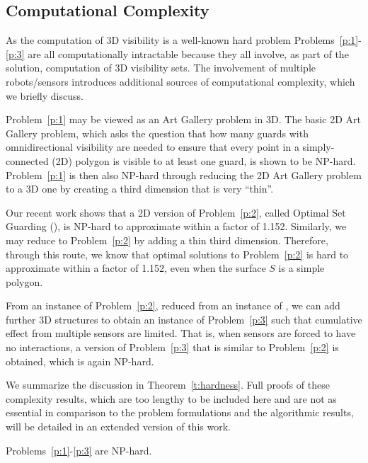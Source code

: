 \subsection{Computational Complexity}\label{subsec:complexity}
\vspace{-1mm}
As the computation of 3D visibility is a well-known hard problem \cite{canny1987new}
Problems~\ref{p:1}-\ref{p:3} are all computationally intractable because they all involve, as part of the solution, computation of 3D visibility sets. The involvement of multiple robots/sensors introduces additional sources of computational complexity, which we briefly discuss. 

Problem~\ref{p:1} may be viewed as an Art Gallery \cite{o1987art} problem in 3D. The basic 2D Art Gallery problem, which asks the question that how many guards with omnidirectional visibility are needed to ensure that every point in a simply-connected (2D) polygon is visible to at least one guard, is shown to be NP-hard\cite{lee1986computational}. Problem~\ref{p:1} is then also NP-hard through reducing the 2D Art Gallery problem to a 3D one by creating a third dimension that is very ``thin''.

Our recent work \cite{FenYuRSS20} shows that a 2D version of Problem~\ref{p:2}, called Optimal Set Guarding (\osg), is NP-hard to approximate within a factor of 1.152. Similarly, we may reduce \osg to Problem~\ref{p:2} by adding a thin third dimension. Therefore, through this route, we know that optimal solutions to Problem~\ref{p:2} is hard to approximate within a factor of 1.152, even when the surface $S$  is a simple polygon. 

From an instance of Problem~\ref{p:2}, reduced from an instance of \osg, we can add further 3D structures to obtain an instance of Problem~\ref{p:3} such that cumulative effect from multiple sensors are limited. That is, when sensors are forced to have no interactions, a version of Problem~\ref{p:3} that is similar to Problem~\ref{p:2} is obtained, which is again NP-hard. 

We summarize the discussion in Theorem~\ref{t:hardness}. Full proofs of these complexity results, which are too lengthy to be included here and are not as essential in comparison to the problem formulations and the algorithmic results, will be detailed in an extended version of this work. 
\vspace{-1mm}

\begin{theorem}\label{t:hardness}
Problems~\ref{p:1}-\ref{p:3} are NP-hard.
\end{theorem}
    \vspace{-2mm}




